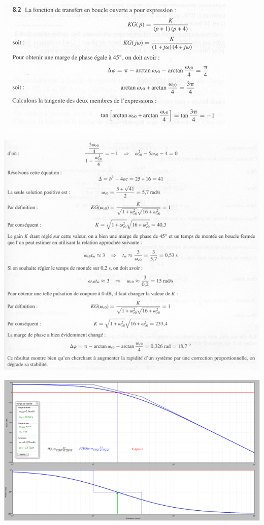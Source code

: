 \documentclass[10pt,fleqn]{article} %
\begin{document}
\begin{center}
\includegraphics[width=\linewidth]{images/cor_01}

\includegraphics[width=\linewidth]{images/cor_02}

\includegraphics[width=\linewidth]{images/cor_03}


\end{center}
\end{document}
